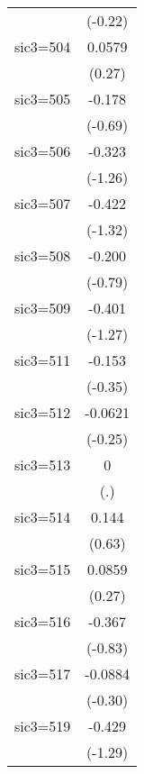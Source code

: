 \begin{table}[htbp]
\begin{tabular*}{0.8\hsize}{@{\hskip\tabcolsep\extracolsep\fill}l*{1}{c}}
                    &     (-0.22)         \\
\addlinespace
sic3=504            &      0.0579         \\
                    &      (0.27)         \\
\addlinespace
sic3=505            &      -0.178         \\
                    &     (-0.69)         \\
\addlinespace
sic3=506            &      -0.323         \\
                    &     (-1.26)         \\
\addlinespace
sic3=507            &      -0.422         \\
                    &     (-1.32)         \\
\addlinespace
sic3=508            &      -0.200         \\
                    &     (-0.79)         \\
\addlinespace
sic3=509            &      -0.401         \\
                    &     (-1.27)         \\
\addlinespace
sic3=511            &      -0.153         \\
                    &     (-0.35)         \\
\addlinespace
sic3=512            &     -0.0621         \\
                    &     (-0.25)         \\
\addlinespace
sic3=513            &           0         \\
                    &         (.)         \\
\addlinespace
sic3=514            &       0.144         \\
                    &      (0.63)         \\
\addlinespace
sic3=515            &      0.0859         \\
                    &      (0.27)         \\
\addlinespace
sic3=516            &      -0.367         \\
                    &     (-0.83)         \\
\addlinespace
sic3=517            &     -0.0884         \\
                    &     (-0.30)         \\
\addlinespace
sic3=519            &      -0.429         \\
                    &     (-1.29)         \\

\end{tabular*}
\end{table}
